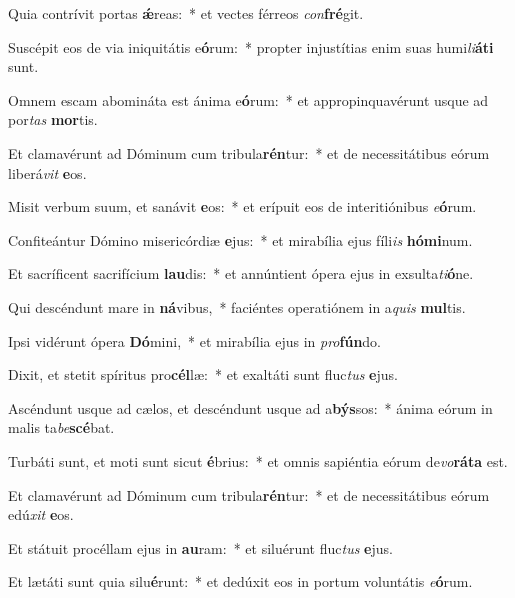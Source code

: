 \item Quia contrívit portas \textbf{ǽ}reas:~* et vectes férreos \textit{con}\textbf{fré}git.
\item Suscépit eos de via iniquitátis e\textbf{ó}rum:~* propter injustítias enim suas humi\textit{li}\textbf{á}\textbf{ti} sunt.
\item Omnem escam abomináta est ánima e\textbf{ó}rum:~* et appropinquavérunt usque ad por\textit{tas} \textbf{mor}tis.
\item Et clamavérunt ad Dóminum cum tribula\textbf{rén}tur:~* et de necessitátibus eórum liberá\textit{vit} \textbf{e}os.
\item Misit verbum suum, et sanávit \textbf{e}os:~* et erípuit eos de interitiónibus \textit{e}\textbf{ó}rum.
\item Confiteántur Dómino misericórdiæ \textbf{e}jus:~* et mirabília ejus fíli\textit{is} \textbf{hó}\textbf{mi}num.
\item Et sacríficent sacrifícium \textbf{lau}dis:~* et annúntient ópera ejus in exsulta\textit{ti}\textbf{ó}ne.
\item Qui descéndunt mare in \textbf{ná}vibus,~* faciéntes operatiónem in a\textit{quis} \textbf{mul}tis.
\item Ipsi vidérunt ópera \textbf{Dó}mini,~* et mirabília ejus in \textit{pro}\textbf{fún}do.
\item Dixit, et stetit spíritus pro\textbf{cél}læ:~* et exaltáti sunt fluc\textit{tus} \textbf{e}jus.
\item Ascéndunt usque ad cælos, et descéndunt usque ad a\textbf{býs}sos:~* ánima eórum in malis ta\textit{be}\textbf{scé}bat.
\item Turbáti sunt, et moti sunt sicut \textbf{é}brius:~* et omnis sapiéntia eórum de\textit{vo}\textbf{rá}\textbf{ta} est.
\item Et clamavérunt ad Dóminum cum tribula\textbf{rén}tur:~* et de necessitátibus eórum edú\textit{xit} \textbf{e}os.
\item Et státuit procéllam ejus in \textbf{au}ram:~* et siluérunt fluc\textit{tus} \textbf{e}jus.
\item Et lætáti sunt quia silu\textbf{é}runt:~* et dedúxit eos in portum voluntátis \textit{e}\textbf{ó}rum.
